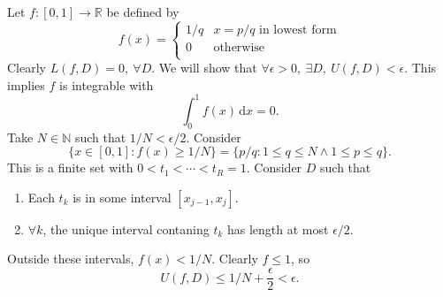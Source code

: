 \begin{example}
    Let $ f:[0,1]\to \mathbb{R} $ be defined by 
    \[
        f(x) = \begin{cases}
        1/q & x = p/q \text{ in lowest form}\\
        0 &\text{otherwise}\\
        \end{cases} 
    \]
    Clearly $ L(f,D)=0,\ \forall D $. We will show that $ \forall \epsilon>0,\ \exists D,\ U(f,D)<\epsilon $. This implies $f$ is integrable with 
    \[
        \int_{0}^{1} f(x) \,\mathrm{d}x=0.
    \]
    Take $ N\in \mathbb{N} $ such that $ 1/N<\epsilon/2 $. Consider 
    \[
        \{x\in [0,1]: f(x)\ge 1/N\} = \{p/q:1\le q\le N \land 1\le p\le q\}.
    \]
    This is a finite set with $ 0<t_1<\cdots<t_R=1 $. Consider $D$ such that 
    \begin{enumerate}
        \item Each $ t_k $ is in some interval $ [x_{j-1},x_j] $.
        \item $ \forall k $, the unique interval contaning $t_k$ has length at most $ \epsilon/2. $
    \end{enumerate}
    \begin{center}
    \end{center}
    Outside these intervals, $ f(x)<1/N $. Clearly $ f\le 1 $, so
    \[
        U(f,D)\le 1/N+\frac{\epsilon}{2}<\epsilon.
    \]
\end{example}

